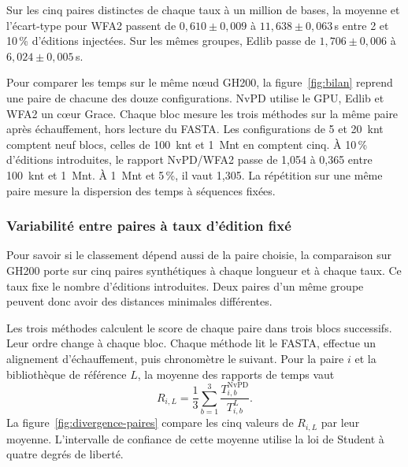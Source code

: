 Sur les cinq paires distinctes de chaque taux à un million de bases, la moyenne et l'écart-type pour WFA2 passent de \(0{,}610\pm0{,}009\) à \(11{,}638\pm0{,}063\)\,s entre 2 et 10\,\% d'éditions injectées. Sur les mêmes groupes, Edlib passe de \(1{,}706\pm0{,}006\) à \(6{,}024\pm0{,}005\)\,s.

Pour comparer les temps sur le même nœud GH200, la figure~\ref{fig:bilan} reprend une paire de chacune des douze configurations. NvPD utilise le GPU, Edlib et WFA2 un cœur Grace. Chaque bloc mesure les trois méthodes sur la même paire après échauffement, hors lecture du FASTA. Les configurations de 5 et 20~knt comptent neuf blocs, celles de 100~knt et 1~Mnt en comptent cinq.
À 10\,\% d’éditions introduites, le rapport NvPD/WFA2 passe de 1,054 à 0,365 entre 100~knt et 1~Mnt. À 1~Mnt et 5\,\%, il vaut 1,305. La répétition sur une même paire mesure la dispersion des temps à séquences fixées.


\subsubsection{Variabilité entre paires à taux d’édition fixé}\label{sec:divergence-paires}
Pour savoir si le classement dépend aussi de la paire choisie, la comparaison sur GH200 porte sur cinq paires synthétiques à chaque longueur et à chaque taux. Ce taux fixe le nombre d’éditions introduites. Deux paires d’un même groupe peuvent donc avoir des distances minimales différentes.

Les trois méthodes calculent le score de chaque paire dans trois blocs successifs. Leur ordre change à chaque bloc. Chaque méthode lit le FASTA, effectue un alignement d’échauffement, puis chronomètre le suivant. Pour la paire \(i\) et la bibliothèque de référence \(L\), la moyenne des rapports de temps vaut
\[
  R_{i,L}=\frac{1}{3}\sum_{b=1}^{3}\frac{T_{i,b}^{\mathrm{NvPD}}}{T_{i,b}^{L}} .
\]
La figure~\ref{fig:divergence-paires} compare les cinq valeurs de \(R_{i,L}\) par leur moyenne. L’intervalle de confiance de cette moyenne utilise la loi de Student à quatre degrés de liberté.

